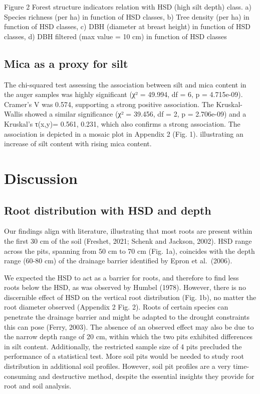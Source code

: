 \documentclass[fleqn,12pt]{latex/stylish_article} %
\begin{document}
\normalsize
Figure 2 Forest structure indicators relation with HSD (high silt depth) class. a) Species richness (per ha) in function of HSD classes, b) Tree density (per ha) in function of HSD classes, c) DBH (diameter at breast height) in function of HSD classes, d) DBH filtered (max value = 10 cm) in function of HSD classes

\hypertarget{mica-as-a-proxy-for-silt}{%
\subsection{Mica as a proxy for silt}\label{mica-as-a-proxy-for-silt}}

The chi-squared test assessing the association between silt and mica content in the auger samples was highly significant (χ² = 49.994, df = 6, p = 4.715e-09). Cramer's V was 0.574, supporting a strong positive association. The Kruskal-Wallis showed a similar significance (χ² = 39.456, df = 2, p = 2.706e-09) and a Kruskal's τ(x,y)= 0.561, 0.231, which also confirms a strong association. The association is depicted in a mosaic plot in Appendix 2 (Fig. 1). illustrating an increase of silt content with rising mica content.

\hypertarget{discussion}{%
\section{Discussion}\label{discussion}}

\hypertarget{root-distribution-with-hsd-and-depth}{%
\subsection{Root distribution with HSD and depth}\label{root-distribution-with-hsd-and-depth}}

Our findings align with literature, illustrating that most roots are present within the first 30 cm of the soil (Freshet, 2021; Schenk and Jackson, 2002). HSD range across the pits, spanning from 50 cm to 70 cm (Fig. 1a), coincides with the depth range (60-80 cm) of the drainage barrier identified by Epron et al.~(2006).

We expected the HSD to act as a barrier for roots, and therefore to find less roots below the HSD, as was observed by Humbel (1978). However, there is no discernible effect of HSD on the vertical root distribution (Fig. 1b), no matter the root diameter observed (Appendix 2 Fig. 2). Roots of certain species can penetrate the drainage barrier and might be adapted to the drought constraints this can pose (Ferry, 2003). The absence of an observed effect may also be due to the narrow depth range of 20 cm, within which the two pits exhibited differences in silt content. Additionally, the restricted sample size of 4 pits precluded the performance of a statistical test. More soil pits would be needed to study root distribution in additional soil profiles. However, soil pit profiles are a very time-consuming and destructive method, despite the essential insights they provide for root and soil analysis.
\end{document}
